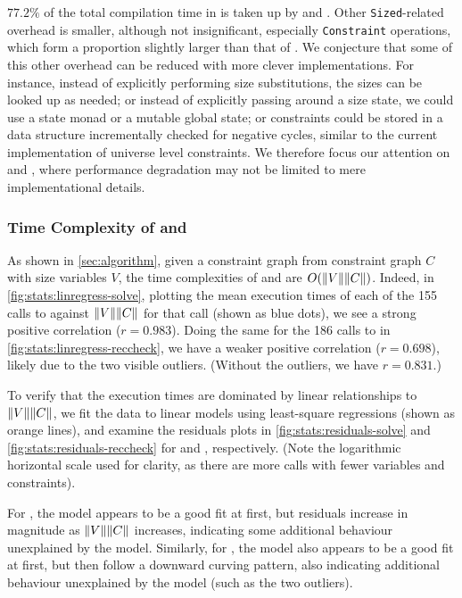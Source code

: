 $77.2\%$ of the total compilation time in \msetlistsized is taken up by \solve and \RecCheck.
Other \texttt{Sized}-related overhead is smaller, although not insignificant,
especially \texttt{Constraint} operations, which form a proportion slightly larger than that of \RecCheck.
We conjecture that some of this other overhead can be reduced with more clever implementations.
For instance, instead of explicitly performing size substitutions, the sizes can be looked up as needed;
or instead of explicitly passing around a size state, we could use a state monad or a mutable global state;
or constraints could be stored in a data structure incrementally checked for negative cycles,
similar to the current implementation of universe level constraints.
We therefore focus our attention on \solve and \RecCheck, where performance degradation may not be limited to mere implementational details.



\subsubsection{Time Complexity of \titlesolve and \titleRecCheck}

As shown in \autoref{sec:algorithm}, given a constraint graph from constraint graph $C$ with size variables $V$,
the time complexities of \solve and \RecCheck are $O(\lVert V\rVert\lVert C\rVert)$.
Indeed, in \autoref{fig:stats:linregress-solve},
plotting the mean execution times of each of the 155 calls to \solve against $\lVert V\rVert\lVert C\rVert$ for that call (shown as blue dots),
we see a strong positive correlation ($r = 0.983$).
Doing the same for the 186 calls to \RecCheck in \autoref{fig:stats:linregress-reccheck},
we have a weaker positive correlation ($r = 0.698$),
likely due to the two visible outliers.
(Without the outliers, we have $r = 0.831$.)

To verify that the execution times are dominated by linear relationships to $\lVert V\rVert\lVert C\rVert$,
we fit the data to linear models using least-square regressions (shown as orange lines),
and examine the residuals plots in \autoref{fig:stats:residuals-solve} and \autoref{fig:stats:residuals-reccheck}
for \solve and \RecCheck, respectively.
(Note the logarithmic horizontal scale used for clarity, as there are more calls with fewer variables and constraints).

For \solve, the model appears to be a good fit at first,
but residuals increase in magnitude as $\lVert V\rVert\lVert C\rVert$ increases,
indicating some additional behaviour unexplained by the model.
Similarly, for \RecCheck, the model also appears to be a good fit at first,
but then follow a downward curving pattern,
also indicating additional behaviour unexplained by the model (such as the two outliers).

